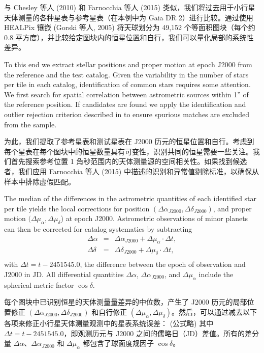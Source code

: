 \documentclass[review]{elsarticle}
\begin{document}
与 Chesley 等人 (2010) 和 Farnocchia 等人 (2015) 类似，我们将过去用于小行星天体测量的各种星表与参考星表（在本例中为 Gaia DR 2）进行比较。通过使用 HEALPix 镶嵌 (Gorski 等人, 2005) 将天球划分为 49,152 个等面积图块（每个约 0.8 平方度），并比较给定图块内的恒星位置和自行，我们可以量化局部的系统性差异。

To this end we extract stellar positions and proper motion at epoch J2000 from the reference and the test catalog.
Given the variability in the number of stars per tile in each catalog, identification of common stars requires some attention. We first search for spatial correlation between astrometric sources within  1'' of the reference position. 
If candidates are found we apply the identification and outlier rejection criterion described in \citet{farnocchia15} to
ensure spurious matches are excluded from the sample.

为此，我们提取了参考星表和测试星表在 J2000 历元的恒星位置和自行。考虑到每个星表在每个图块中的恒星数量具有可变性，识别共同的恒星需要一些关注。我们首先搜索参考位置 1 角秒范围内的天体测量源的空间相关性。如果找到候选者，我们应用 Farnocchia 等人 (2015) 中描述的识别和异常值剔除标准，以确保从样本中排除虚假匹配。

%
The median of the differences in the astrometric quantities of each identified star per tile yields the local corrections for position $(\Delta \alpha_{J2000}, \Delta \delta_{J2000})$, and proper motion $(\Delta \mu_{\alpha}, \Delta \mu_{\delta}$) at epoch J2000.
%
Astrometric observations of minor planets can then be corrected for catalog systematics by subtracting
 \begin{eqnarray*}
\Delta\alpha & = & \Delta \alpha_{J2000} + \Delta \mu_{\alpha} \cdot \Delta t,\\
\Delta\delta & = & \Delta \delta_{J2000} + \Delta \mu_{\delta} \cdot \Delta t,\\
\end{eqnarray*}
with $\Delta t=t - 2451545.0$, the difference between the epoch of observation and J2000 in JD.
All differential quantities $\Delta{\alpha}$, $\Delta{\alpha}_{J2000}$, and $\Delta \mu_{\alpha}$ include the spherical metric factor $\cos\delta$.

每个图块中已识别恒星的天体测量量差异的中位数，产生了 J2000 历元的局部位置修正 $(\Delta \alpha_{J2000}, \Delta \delta_{J2000})$ 和自行修正 $(\Delta \mu_{\alpha}, \Delta \mu_{\delta})$。然后，可以通过减去以下各项来修正小行星天体测量观测中的星表系统误差：
(公式略)
其中 $\Delta t=t - 2451545.0$，即观测历元与 J2000 之间的儒略日（JD）差值。所有的差分量 $\Delta{\alpha}$、$\Delta{\alpha}_{J2000}$ 和 $\Delta \mu_{\alpha}$ 都包含了球面度规因子 $\cos\delta$。
%
\end{document}
